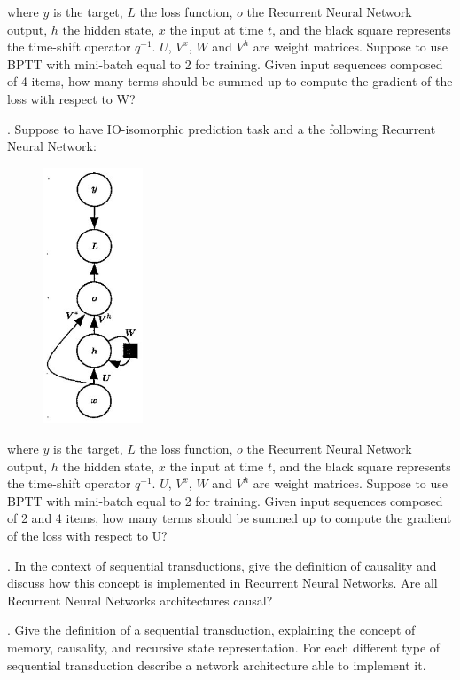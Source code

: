 where $y$ is the target, $L$ the loss function, $o$ the Recurrent Neural Network output, $h$ the hidden state, $x$ the input at time $t$, and the black square represents the time-shift operator $q^{-1}$. $U$, $V^{x}$, $W$ and $V^{h}$ are weight matrices. Suppose to use BPTT with mini-batch equal to 2 for training. Given input sequences composed of 4 items, how many terms should be summed up to compute the gradient of the loss with respect to W?

. Suppose to have IO-isomorphic prediction task and a the following Recurrent Neural Network:

\begin{figure}[h]
    \centering
    \includegraphics[width=3cm]{Images/io-isomorphic-rnn.jpg}
    \label{fig:io-rnn}
\end{figure}

where $y$ is the target, $L$ the loss function, $o$ the Recurrent Neural Network output, $h$ the hidden state, $x$ the input at time $t$, and the black square represents the time-shift operator $q^{-1}$. $U$, $V^{x}$, $W$ and $V^{h}$ are weight matrices. Suppose to use BPTT with mini-batch equal to 2 for training. Given input sequences composed of 2 and 4 items, how many terms should be summed up to compute the gradient of the loss with respect to U?



. In the context of sequential transductions, give the definition of causality and discuss how this concept is implemented in Recurrent Neural Networks. Are all Recurrent Neural Networks architectures causal?

\newpage
{}. Give the definition of a sequential transduction, explaining the concept of memory, causality, and recursive state representation. For each different type of sequential transduction describe a network architecture able to implement it.

